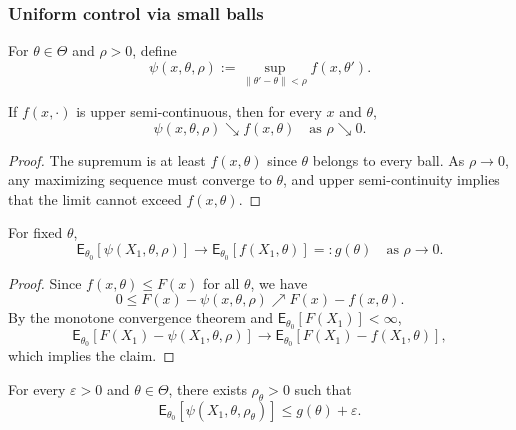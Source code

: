 \subsubsection{Uniform control via small balls}

For $\theta\in\Theta$ and $\rho>0$, define
\begin{equation*}
\psi(x,\theta,\rho)
:=
\sup_{\|\theta'-\theta\|<\rho} f(x,\theta').
\end{equation*}

\begin{claim}
If $f(x,\cdot)$ is upper semi-continuous, then for every $x$ and $\theta$,
\begin{equation*}
\psi(x,\theta,\rho) \searrow f(x,\theta)
\quad \text{as } \rho\searrow 0.
\end{equation*}
\end{claim}

\begin{proof}
The supremum is at least $f(x,\theta)$ since $\theta$ belongs to every ball. As $\rho\to0$, any maximizing sequence must converge to $\theta$, and upper semi-continuity implies that the limit cannot exceed $f(x,\theta)$.
\end{proof}

\begin{claim}
\label{cl:expectation-convergence}
For fixed $\theta$,
\begin{equation*}
\mathsf{E}_{\theta_0}[\psi(X_1,\theta,\rho)]
\longrightarrow
\mathsf{E}_{\theta_0}[f(X_1,\theta)]
=: g(\theta)
\quad \text{as } \rho\to0.
\end{equation*}
\end{claim}

\begin{proof}
Since $f(x,\theta)\le F(x)$ for all $\theta$, we have
\begin{equation*}
0 \le F(x)-\psi(x,\theta,\rho) \nearrow F(x)-f(x,\theta).
\end{equation*}
By the monotone convergence theorem and $\mathsf{E}_{\theta_0}[F(X_1)]<\infty$,
\begin{equation*}
\mathsf{E}_{\theta_0}[F(X_1)-\psi(X_1,\theta,\rho)]
\to
\mathsf{E}_{\theta_0}[F(X_1)-f(X_1,\theta)],
\end{equation*}
which implies the claim.
\end{proof}

\begin{note}
For every $\varepsilon>0$ and $\theta\in\Theta$, there exists $\rho_\theta>0$ such that
\begin{equation*}
\mathsf{E}_{\theta_0}[\psi(X_1,\theta,\rho_\theta)]
\le g(\theta)+\varepsilon.
\end{equation*}
\end{note}

